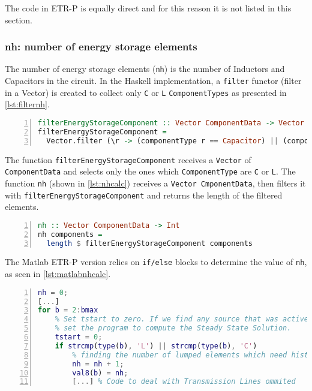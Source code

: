 The code in ETR-P is equally direct and for this reason it is not listed in this section.

\subsubsection {nh: number of energy storage elements}

The number of energy storage elements (\lstinline!nh!) is the number of Inductors and Capacitors in the circuit. In the Haskell implementation, a \lstinline!filter! functor (filter in a Vector) is created to collect only \lstinline!C! or \lstinline!L! \lstinline!ComponentTypes! as presented in \cref{lst:filternh}.

\begin{lstlisting}[language=Haskell, numbers=left, caption={filtering energy storage elements}, captionpos=b, label={lst:filternh}]
filterEnergyStorageComponent :: Vector ComponentData -> Vector ComponentData
filterEnergyStorageComponent =
  Vector.filter (\r -> (componentType r == Capacitor) || (componentType r == Inductor))
\end{lstlisting}

The function \lstinline!filterEnergyStorageComponent! receives a \lstinline!Vector! of \lstinline!ComponentData! and selects only the ones which \lstinline!ComponentType! are \lstinline!C! or \lstinline!L!. The function \lstinline!nh! (shown in \cref{lst:nhcalc}) receives a \lstinline!Vector CmponentData!, then filters it with \lstinline!filterEnergyStorageComponent! and returns the length of the filtered elements.

\begin{lstlisting}[language=Haskell, numbers=left, caption={Determining the number energy storage elements nh}, captionpos=b, label={lst:nhcalc}]
nh :: Vector ComponentData -> Int
nh components =
  length $ filterEnergyStorageComponent components
\end{lstlisting}

The Matlab ETR-P version relies on \lstinline!if/else! blocks to determine the value of \lstinline!nh!, as seen in \cref{lst:matlabnhcalc}.
\begin{lstlisting}[language=Matlab, numbers=left, caption={Determining the number energy storage elements nh with ETR-P}, captionpos=b, label={lst:matlabnhcalc}]
% nh = number of energy storage elements
nh = 0;
[...]
for b = 2:bmax
    % Set tstart to zero. If we find any source that was active at t<0,
    % set the program to compute the Steady State Solution.
    tstart = 0;
    if strcmp(type(b), 'L') || strcmp(type(b), 'C')
        % finding the number of lumped elements which need history terms
        nh = nh + 1;
        val8(b) = nh;
        [...] % Code to deal with Transmission Lines ommited
\end{lstlisting}


